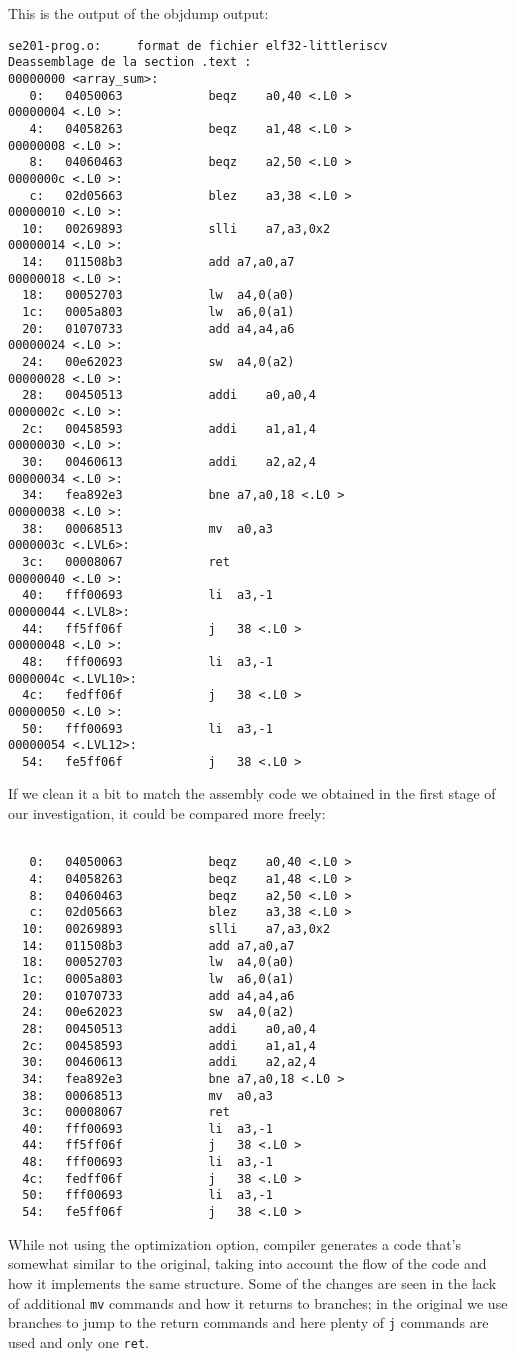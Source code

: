 \documentclass[a4paper]{article}
\begin{document}
This is the output of the objdump output:
\begin{lstlisting}[language={[x86masm]Assembler}, caption=Objdump output]
se201-prog.o:     format de fichier elf32-littleriscv
Deassemblage de la section .text :
00000000 <array_sum>:
   0:	04050063          	beqz	a0,40 <.L0 >
00000004 <.L0 >:
   4:	04058263          	beqz	a1,48 <.L0 >
00000008 <.L0 >:
   8:	04060463          	beqz	a2,50 <.L0 >
0000000c <.L0 >:
   c:	02d05663          	blez	a3,38 <.L0 >
00000010 <.L0 >:
  10:	00269893          	slli	a7,a3,0x2
00000014 <.L0 >:
  14:	011508b3          	add	a7,a0,a7
00000018 <.L0 >:
  18:	00052703          	lw	a4,0(a0)
  1c:	0005a803          	lw	a6,0(a1)
  20:	01070733          	add	a4,a4,a6
00000024 <.L0 >:
  24:	00e62023          	sw	a4,0(a2)
00000028 <.L0 >:
  28:	00450513          	addi	a0,a0,4
0000002c <.L0 >:
  2c:	00458593          	addi	a1,a1,4
00000030 <.L0 >:
  30:	00460613          	addi	a2,a2,4
00000034 <.L0 >:
  34:	fea892e3          	bne	a7,a0,18 <.L0 >
00000038 <.L0 >:
  38:	00068513          	mv	a0,a3
0000003c <.LVL6>:
  3c:	00008067          	ret
00000040 <.L0 >:
  40:	fff00693          	li	a3,-1
00000044 <.LVL8>:
  44:	ff5ff06f          	j	38 <.L0 >
00000048 <.L0 >:
  48:	fff00693          	li	a3,-1
0000004c <.LVL10>:
  4c:	fedff06f          	j	38 <.L0 >
00000050 <.L0 >:
  50:	fff00693          	li	a3,-1
00000054 <.LVL12>:
  54:	fe5ff06f          	j	38 <.L0 >
\end{lstlisting}

If we clean it a bit to match the assembly code we obtained in the first stage of our investigation, it could be compared more freely:
\begin{lstlisting}[language={[x86masm]Assembler}, caption=Refined Objdump output without -O option]
   
   0:	04050063          	beqz	a0,40 <.L0 >
   4:	04058263          	beqz	a1,48 <.L0 >
   8:	04060463          	beqz	a2,50 <.L0 >
   c:	02d05663          	blez	a3,38 <.L0 >
  10:	00269893          	slli	a7,a3,0x2
  14:	011508b3          	add	a7,a0,a7
  18:	00052703          	lw	a4,0(a0)
  1c:	0005a803          	lw	a6,0(a1)
  20:	01070733          	add	a4,a4,a6
  24:	00e62023          	sw	a4,0(a2)
  28:	00450513          	addi	a0,a0,4
  2c:	00458593          	addi	a1,a1,4
  30:	00460613          	addi	a2,a2,4
  34:	fea892e3          	bne	a7,a0,18 <.L0 >
  38:	00068513          	mv	a0,a3
  3c:	00008067          	ret
  40:	fff00693          	li	a3,-1
  44:	ff5ff06f          	j	38 <.L0 >
  48:	fff00693          	li	a3,-1
  4c:	fedff06f          	j	38 <.L0 >
  50:	fff00693          	li	a3,-1
  54:	fe5ff06f          	j	38 <.L0 >
\end{lstlisting}
While not using the optimization option, compiler generates a code that's somewhat similar to the original, taking into account the flow of the code and how it implements the same structure.
Some of the changes are seen in the lack of additional \texttt{mv} commands and how it returns to branches; in the original we use branches to jump to the return commands and here plenty of \texttt{j} commands are used and only one \texttt{ret}.
\end{document}
